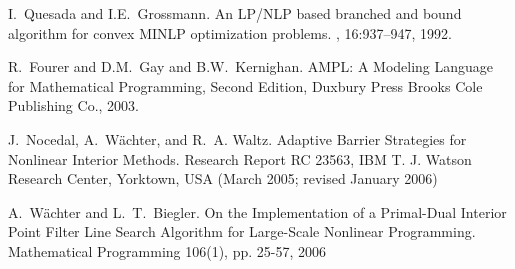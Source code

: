 \begin{thebibliography}{10}
I.~Quesada and I.E.~Grossmann.
\newblock An {LP/NLP} based branched and bound algorithm for convex {MINLP} optimization problems.
, 16:937--947, 1992.

R.~Fourer and D.M.~Gay and B.W.~Kernighan.
\newblock AMPL: A Modeling Language for Mathematical
Programming, Second Edition,
\newblock Duxbury Press Brooks Cole Publishing Co., 2003.


J.~Nocedal, A.~W\"achter, and R.~A. Waltz.
\newblock Adaptive Barrier Strategies for Nonlinear Interior Methods.
\newblock Research Report RC 23563, IBM T. J. Watson Research Center, Yorktown, USA (March 2005; revised January 2006)

A.~W\"achter and L.~T.~Biegler.
\newblock On the Implementation of a Primal-Dual Interior Point Filter Line Search Algorithm for Large-Scale Nonlinear Programming.
\newblock Mathematical Programming 106(1), pp. 25-57, 2006
\end{thebibliography}

